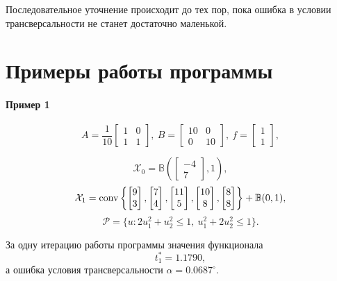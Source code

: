 \documentclass[11pt]{article}
\newcommand\PS{\mathcal{P}}
\newcommand\X{\mathcal{X}}
\newcommand\Cl[2]{\begin{bmatrix}
#1 \\ #2
\end{bmatrix}}
\newcommand\Conv[1]{{\rm conv}\left\{ #1 \right\}}
\begin{document}
Последовательное уточнение происходит до тех пор, пока ошибка в условии трансверсальности не 
станет достаточно маленькой.

\section{Примеры работы программы}

\paragraph{Пример 1\\}

\begin{equation}
A = \frac1{10}\begin{bmatrix}
1 & 0 \\ 1 & 1
\end{bmatrix},\ 
B = \begin{bmatrix}
10 & 0 \\ 0 & 10
\end{bmatrix}, \
f = \begin{bmatrix}
1 \\ 1
\end{bmatrix},
\end{equation}

$$\X_0 = \mathbb{B}\left(\Cl{-4}{7}, 1\right),$$
$$\X_1 = \Conv{\Cl{9}{3}, \Cl{7}{4}, \Cl{11}{5}, \Cl{10}{8}, \Cl{8}{8}} + \mathbb{B}(0, 1),$$
$$\PS = \{u\colon 2u_1^2 + u_2^2 \le 1, \ u_1^2 + 2u_2^2 \le 1 \}.$$

За одну итерацию работы программы значения функционала 
$$t_1^* = 1.1790,$$
а ошибка условия трансверсальности $\alpha = 0.0687^\circ$.
\end{document}
